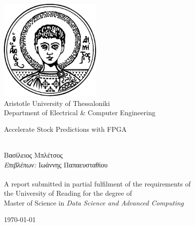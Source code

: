 \documentclass[a4paper,11pt,oneside]{book}
\begin{document}
    
    \frontmatter
    
    \begin{titlepage}      
        \begin{center}
            \includegraphics[width=5cm]{figures/auth_logo.png}\\[0.8cm]
            {\LARGE Aristotle University of Thessaloniki\\[0.5cm]
            Department of Electrical \& Computer Engineering}\\[2cm]		%
			
            \linespread{1.2}\huge {
                Accelerate Stock Predictions with FPGA
            
            }
            \linespread{1}~\\[2cm]
            {\Large 
                Βασίλειος Μπλέτσος        
            }\\[1cm] 
            

            {\large 
                \emph{Επιβλέπων:} Ιωάννης Παπαευσταθίου\\
            }\\[1cm] %
            
            \large A report submitted in partial fulfilment of the requirements of\\the University of Reading for the degree of\\
            Master of Science 
            in \textit{Data Science and Advanced Computing}\\[0.3cm] 
            \vfill
            
            
            \today %
        \end{center}
    \end{titlepage}
     
\end{document}
